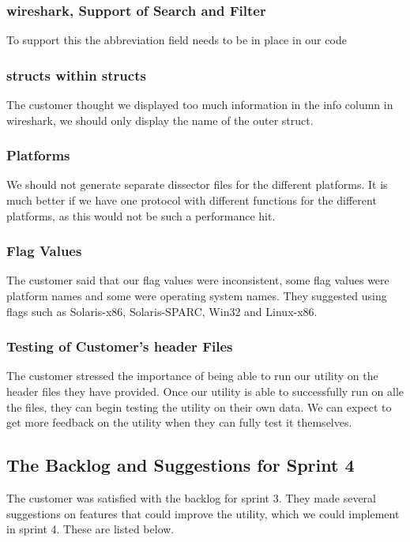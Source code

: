 \subsubsection{\Gls{wireshark}, Support of Search and Filter}
To support this the abbreviation field needs to be in place in our code

\subsubsection{\Glspl{struct} within \Glspl{struct}}
The customer thought we displayed too much information in the info column in \Gls{wireshark},
 we should only display the name of the outer \gls{struct}.

\subsubsection{Platforms}
We should not generate separate \gls{dissector} files for the different platforms. It is much better if we have one \gls{protocol}
with different functions for the different platforms, as this would not be such a performance hit.

\subsubsection{Flag Values}
The customer said that our flag values were inconsistent, some flag values were platform names and some were operating
system names. They suggested using flags such as Solaris-x86, Solaris-SPARC, Win32 and Linux-x86.

\subsubsection{Testing of Customer's \Gls{header} Files}
The customer stressed the importance of being able to run our \gls{utility} on the \gls{header} files they have provided.
Once our \gls{utility} is able to successfully run on alle the files, they can begin testing the \gls{utility} on their own data.
We can expect to get more feedback on the \gls{utility} when they can fully test it themselves.

\subsection{The Backlog and Suggestions for Sprint 4}
The customer was satisfied with the backlog for sprint 3.
They made several suggestions on features that could improve the \gls{utility}, which we could implement in sprint 4.
These are listed below.

